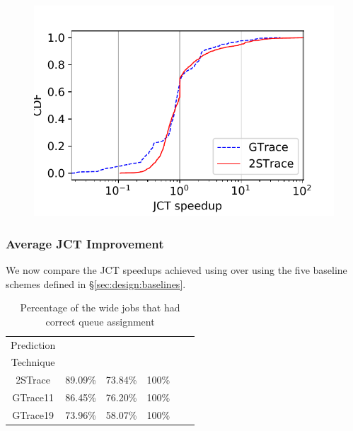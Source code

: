\begin{figure}
\includegraphics[width=0.9\linewidth]{figures/testbed/testbedBothTracesSpeedupCDF-speedUp-CDF.pdf}
\label{fig:testbed:speedup:cdf}
\end{figure}

\subsubsection{Average JCT Improvement}
\label{sec:sim:averageJCT}

We now compare the JCT speedups achieved using \slearn over using the
five baseline schemes defined in \S\ref{sec:design:baselines}.

\begin{table}[tp]
  \caption{Percentage of the wide jobs that had correct queue assignment 
    }
\vspace{-0.1in}
\label{table:sim:correctQueue}
  \centering
      {\small
	\begin{tabular}{|c|c|c|c|c|c|} 
	  \hline
		Prediction&	\slearn &\primarybasepredict &\oracle\\  
		Technique&&&\\
	  \hline
		2STrace &89.09\%&73.84\%&100\%\\
		GTrace11 &86.45\%&76.20\%&100\%\\
		GTrace19 &73.96\%&58.07\%&100\%\\
	  \hline
	\end{tabular}
      }
\vspace{-0.1in}
\end{table}

